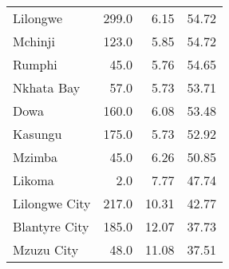 \begin{tabular}{lrrr}
Lilongwe      &   299.0 &           6.15 &               54.72 \\
Mchinji       &   123.0 &           5.85 &               54.72 \\
Rumphi        &    45.0 &           5.76 &               54.65 \\
Nkhata Bay    &    57.0 &           5.73 &               53.71 \\
Dowa          &   160.0 &           6.08 &               53.48 \\
Kasungu       &   175.0 &           5.73 &               52.92 \\
Mzimba        &    45.0 &           6.26 &               50.85 \\
Likoma        &     2.0 &           7.77 &               47.74 \\
Lilongwe City &   217.0 &          10.31 &               42.77 \\
Blantyre City &   185.0 &          12.07 &               37.73 \\
Mzuzu City    &    48.0 &          11.08 &               37.51 \\
\bottomrule
\end{tabular}
